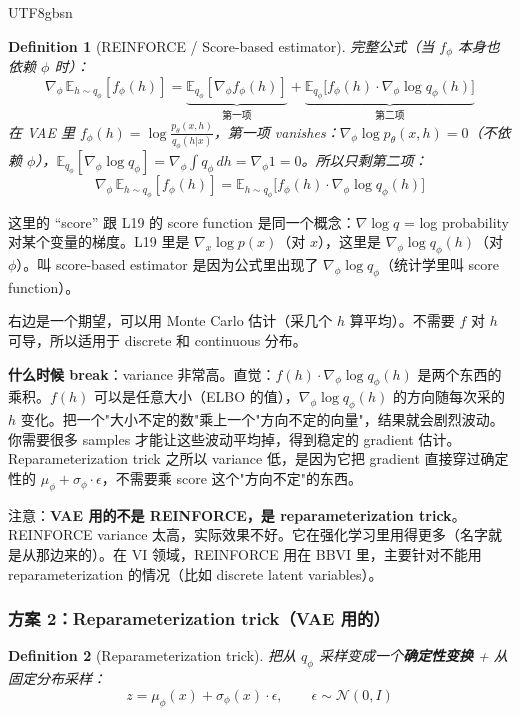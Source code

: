 \documentclass[11pt]{article}
\newtheorem{definition}{Definition}[section]
\begin{document}
\begin{CJK}{UTF8}{gbsn}
\begin{definition}[REINFORCE / Score-based estimator]
完整公式（当 $f_\phi$ 本身也依赖 $\phi$ 时）：
\[
  \nabla_\phi \,\mathbb{E}_{h \sim q_\phi} [f_\phi(h)] = \underbrace{\mathbb{E}_{q_\phi}[\nabla_\phi f_\phi(h)]}_{\text{第一项}} + \underbrace{\mathbb{E}_{q_\phi}\!\big[f_\phi(h) \cdot \nabla_\phi \log q_\phi(h)\big]}_{\text{第二项}}
\]
在 VAE 里 $f_\phi(h) = \log \frac{p_\theta(x,h)}{q_\phi(h|x)}$，第一项 vanishes：$\nabla_\phi \log p_\theta(x,h) = 0$（不依赖 $\phi$），$\mathbb{E}_{q_\phi}[\nabla_\phi \log q_\phi] = \nabla_\phi \int q_\phi\, dh = \nabla_\phi 1 = 0$。所以只剩第二项：
\[
  \nabla_\phi \,\mathbb{E}_{h \sim q_\phi} [f_\phi(h)] = \mathbb{E}_{h \sim q_\phi}\!\big[f_\phi(h) \cdot \nabla_\phi \log q_\phi(h)\big]
\]
\end{definition}

这里的 ``score'' 跟 L19 的 score function 是同一个概念：$\nabla \log q$ = log probability 对某个变量的梯度。L19 里是 $\nabla_x \log p(x)$（对 $x$），这里是 $\nabla_\phi \log q_\phi(h)$（对 $\phi$）。叫 score-based estimator 是因为公式里出现了 $\nabla_\phi \log q_\phi$（统计学里叫 score function）。

右边是一个期望，可以用 Monte Carlo 估计（采几个 $h$ 算平均）。不需要 $f$ 对 $h$ 可导，所以适用于 discrete 和 continuous 分布。

\textbf{什么时候 break}：variance 非常高。直觉：$f(h) \cdot \nabla_\phi \log q_\phi(h)$ 是两个东西的乘积。$f(h)$ 可以是任意大小（ELBO 的值），$\nabla_\phi \log q_\phi(h)$ 的方向随每次采的 $h$ 变化。把一个"大小不定的数"乘上一个"方向不定的向量"，结果就会剧烈波动。你需要很多 samples 才能让这些波动平均掉，得到稳定的 gradient 估计。Reparameterization trick 之所以 variance 低，是因为它把 gradient 直接穿过确定性的 $\mu_\phi + \sigma_\phi \cdot \epsilon$，不需要乘 score 这个"方向不定"的东西。

注意：\textbf{VAE 用的不是 REINFORCE，是 reparameterization trick}。REINFORCE variance 太高，实际效果不好。它在强化学习里用得更多（名字就是从那边来的）。在 VI 领域，REINFORCE 用在 BBVI 里，主要针对不能用 reparameterization 的情况（比如 discrete latent variables）。

\subsubsection{方案 2：Reparameterization trick（VAE 用的）}

\begin{definition}[Reparameterization trick]
把从 $q_\phi$ 采样变成一个\textbf{确定性变换} + 从固定分布采样：
\[
  z = \mu_\phi(x) + \sigma_\phi(x) \cdot \epsilon, \qquad \epsilon \sim \mathcal{N}(0, I)
\]
\end{definition}


\end{CJK}
\end{document}
